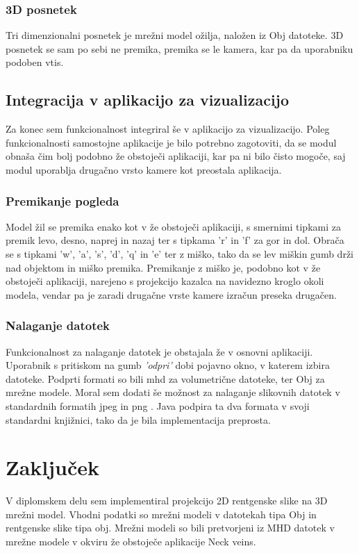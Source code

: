\documentclass[a4paper, 12pt]{book}
\begin{document}
\subsection*{3D posnetek}

Tri dimenzionalni posnetek je mrežni model ožilja, naložen iz Obj datoteke. 3D posnetek se sam po sebi ne premika, premika se le kamera, kar pa da uporabniku podoben vtis.

\section{Integracija v aplikacijo za vizualizacijo}

Za konec sem funkcionalnost integriral še v aplikacijo za vizualizacijo. Poleg funkcionalnosti samostojne aplikacije je bilo potrebno zagotoviti, da se modul obnaša čim bolj podobno že obstoječi aplikaciji, kar pa ni bilo čisto mogoče, saj modul uporablja drugačno vrsto kamere kot preostala aplikacija. 

\subsection*{Premikanje pogleda}

Model žil se premika enako kot v že obstoječi aplikaciji, s smernimi tipkami za premik levo, desno, naprej in nazaj ter s tipkama 'r' in 'f' za gor in dol. Obrača se s tipkami 'w', 'a', 's', 'd', 'q' in 'e' ter z miško, tako da se lev miškin gumb drži nad objektom in miško premika. Premikanje z miško je, podobno kot v že obstoječi aplikaciji, narejeno s projekcijo kazalca na navidezno kroglo okoli modela, vendar pa je zaradi drugačne vrste kamere izračun preseka drugačen.

\subsection*{Nalaganje datotek}
Funkcionalnost za nalaganje datotek je obstajala že v osnovni aplikaciji. Uporabnik s pritiskom na gumb \emph{'odpri'} dobi pojavno okno, v katerem izbira datoteke. Podprti formati so bili mhd za volumetrične datoteke, ter Obj za mrežne modele. Moral sem dodati še možnost za nalaganje slikovnih datotek v standardnih formatih jpeg in png \cite{png}. Java podpira ta dva formata v svoji standardni knjižnici, tako da je bila implementacija preprosta.

\chapter{Zaključek}
V diplomskem delu sem implementiral projekcijo 2D rentgenske slike na 3D mrežni model. Vhodni podatki so mrežni modeli v datotekah tipa Obj in rentgenske slike tipa obj. Mrežni modeli so bili pretvorjeni iz MHD datotek v mrežne modele v okviru že obstoječe aplikacije Neck veins.
\end{document}
